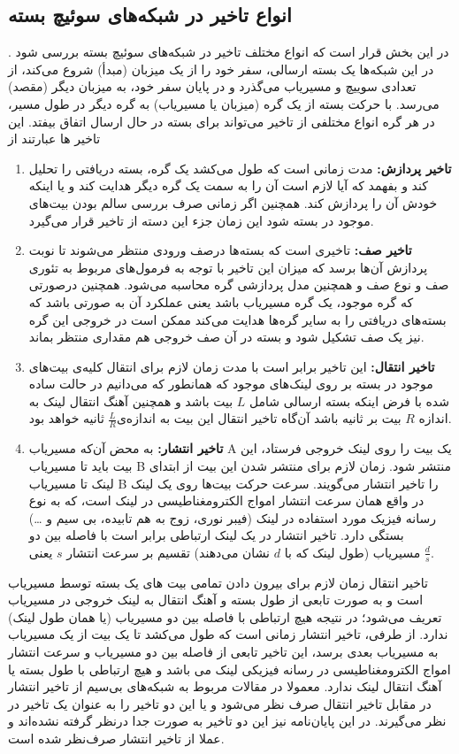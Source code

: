     \subsection{انواع تاخیر در شبکه‌های سوئیچ بسته}
    در این بخش قرار است که انواع مختلف تاخیر در شبکه‌های سوئیچ بسته بررسی شود . 
    در این شبکه‌ها یک بسته ارسالی، سفر خود را از یک میزبان (مبدأ) شروع می‌کند، از تعدادی سوییچ و مسیریاب می‌گذرد و در پایان سفر خود، به میزبان دیگر (مقصد) می‌رسد. با حرکت بسته از یک گره (میزبان یا مسیریاب) به گره دیگر در طول مسیر، در هر گره انواع مختلفی از تاخیر می‌تواند برای بسته در حال ارسال اتفاق بیفتد.
    این تاخیر ها عبارتند از
    \begin{enumerate}
    	\item \textbf{تاخیر پردازش:}
    مدت زمانی است که طول می‌کشد یک گره، بسته دریافتی را تحلیل کند و بفهمد که آیا لازم است آن را به سمت یک گره دیگر هدایت کند و یا اینکه خودش آن را پردازش کند. همچنین اگر زمانی صرف بررسی سالم بودن بیت‌های موجود در بسته شود این زمان جزء این دسته از تاخیر قرار می‌گیرد.
    \item \textbf{تاخیر صف:}
    تاخیری است که بسته‌ها درصف ورودی منتظر می‌شوند تا نوبت پردازش آن‌ها برسد که میزان این تاخیر با توجه به فرمول‌های مربوط به تئوری صف و نوع صف و همچنین مدل پردازشی گره محاسبه می‌شود. همچنین درصورتی که گره موجود، یک گره مسیریاب باشد یعنی عملکرد آن به صورتی باشد که بسته‌های دریافتی را به سایر گره‌ها هدایت می‌کند ممکن است در خروجی این گره نیز یک صف تشکیل شود و بسته در آن صف خروجی هم مقداری منتظر بماند.
    \item \textbf{تاخیر انتقال:} 
    این تاخیر برابر است با مدت زمان لازم برای انتقال کلیه‌ی بیت‌های موجود در بسته بر روی لینک‌های موجود که همانطور که می‌دانیم در حالت ساده شده با فرض اینکه بسته ارسالی شامل $L$ بیت باشد و همچنین آهنگ انتقال لینک به اندازه $R$ بیت بر ثانیه باشد آن‌گاه تاخیر انتقال این بیت به اندازه‌ی$\frac{L}{R}$ ثانیه خواهد بود. 
    \item \textbf{تاخیر انتشار:} 
    به محض آن‌که مسیریاب A یک بیت را روی لینک خروجی فرستاد، این بیت باید تا مسیریاب B منتشر شود. زمان لازم برای منتشر شدن این بیت از ابتدای لینک تا مسیریاب B را تاخیر انتشار می‌گویند.
    سرعت حرکت بیت‌ها روی یک لینک در واقع همان سرعت انتشار امواج الکترومغناطیسی در لینک است، که به نوع رسانه فیزیک مورد استفاده در لینک (فیبر نوری، زوج به هم تابیده، بی سیم و …) بستگی دارد.
    تاخیر انتشار در یک لینک ارتباطی برابر است با فاصله بین دو مسیریاب (طول لینک که با $d$ نشان می‌دهند) تقسیم بر سرعت انتشار $s$ یعنی $\frac{d}{s}$.
    \end{enumerate}
    تاخیر انتقال زمان لازم برای بیرون دادن تمامی بیت های یک بسته توسط مسیریاب است و به صورت تابعی از طول بسته و آهنگ انتقال به لینک خروجی در مسیریاب تعریف می‌شود؛ در نتیجه هیچ ارتباطی با فاصله بین دو مسیریاب (یا همان طول لینک) ندارد.
    از طرفی، تاخیر انتشار زمانی است که طول می‌کشد تا یک بیت از یک مسیریاب به مسیریاب بعدی برسد، این تاخیر تابعی از فاصله بین دو مسیریاب و سرعت انتشار امواج الکترومغناطیسی در رسانه فیزیکی لینک می باشد و هیچ ارتباطی با طول بسته یا آهنگ انتقال لینک ندارد.
    معمولا در مقالات مربوط به شبکه‌های بی‌سیم از تاخیر انتشار در مقابل تاخیر انتقال صرف نظر می‌شود و یا این دو تاخیر را به عنوان یک تاخیر در نظر می‌گیرند. در این پایان‌نامه نیز این دو تاخیر به صورت جدا درنظر گرفته نشده‌اند و عملا از تاخیر انتشار صرف‌نظر شده است. 
    

